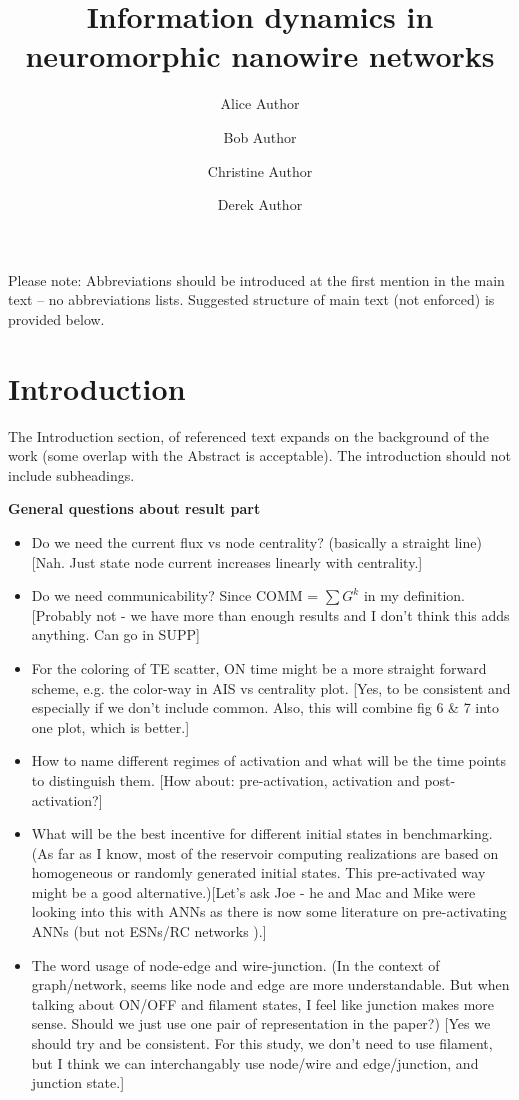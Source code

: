 \documentclass[fleqn,10pt,  amsmath,amssymb,aps]{wlscirep}
\title{Information dynamics in neuromorphic nanowire networks}
\author[1,*]{Alice Author}
\author[2]{Bob Author}
\author[1,2,+]{Christine Author}
\author[2,+]{Derek Author}
\affil[1]{Affiliation, department, city, postcode, country}
\affil[2]{Affiliation, department, city, postcode, country}
\affil[*]{corresponding.author@email.example}
\affil[+]{these authors contributed equally to this work}
\begin{document}
\flushbottom
\maketitle
%
%
\thispagestyle{empty}

\noindent Please note: Abbreviations should be introduced at the first mention in the main text – no abbreviations lists. Suggested structure of main text (not enforced) is provided below.

\section*{Introduction}

The Introduction section, of referenced text expands on the background of the work (some overlap with the Abstract is acceptable). The introduction should not include subheadings.

\clearpage

\textbf{General questions about result part}

\begin{itemize}
	\item Do we need the current flux vs node centrality? (basically a straight line) [Nah. Just state node current increases linearly with centrality.]
	\item Do we need communicability? Since COMM = $\sum G^k$ in my definition.	[Probably not - we have more than enough results and I don't think this adds anything. Can go in SUPP]
	\item  For the coloring of TE scatter, ON time might be a more straight forward scheme, e.g. the color-way in AIS vs centrality plot. [Yes, to be consistent and especially if we don't include common. Also, this will combine fig 6 \& 7 into one plot, which is better.]
	\item How to name different regimes of activation and what will be the time points to distinguish them. [How about: pre-activation, activation and post-activation?]
	\item What will be the best incentive for different initial states in benchmarking. (As far as I know, most of the reservoir computing realizations are based on homogeneous or randomly generated initial states. This pre-activated way might be a good alternative.)[Let's ask Joe - he and Mac and Mike were looking into this with ANNs as there is now some literature on pre-activating ANNs (but not ESNs/RC networks ).]
	\item The word usage of node-edge and wire-junction. (In the context of graph/network, seems like node and edge are more understandable. But when talking about ON/OFF and filament states, I feel like junction makes more sense. Should we just use one pair of representation in the paper?) [Yes we should try and be consistent. For this study, we don't need to use filament, but I think we can interchangably use node/wire and edge/junction, and junction state.]
\end{itemize}
\end{document}
